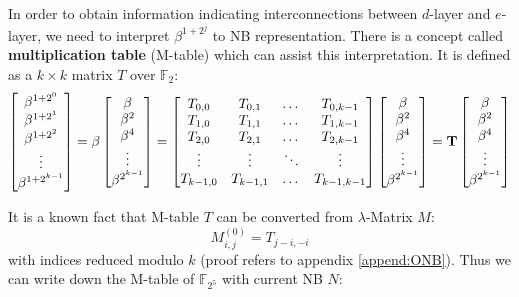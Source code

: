 \begin{Example}
In order to obtain information 
indicating interconnections between $d$-layer and $e$-layer, we need to interpret $\beta^{1+2^j}$ 
to NB representation.
There is a concept called {\bf multiplication table} (M-table) which can assist this interpretation. It is defined as 
a $k\times k$ matrix $T$ over $\mathbb F_2$:
\begin{equation}
\label{eqn:multitable}
\begin{bmatrix}
\beta^{1+2^0} \\ \beta^{1+2^1} \\ \beta^{1+2^2} \\ \vdots \\ \beta^{1+2^{k-1}}
\end{bmatrix}
= \beta
\begin{bmatrix}
\beta \\ \beta^2 \\ \beta^4 \\ \vdots \\ \beta^{2^{k-1}}
\end{bmatrix}
=
\begin{bmatrix}
T_{0,0}      &   T_{0,1}        & \dots & T_{0,k-1}\\
T_{1,0}    &   T_{1,1}           & \dots & T_{1,k-1}\\
T_{2,0}    &   T_{2,1}           & \dots & T_{2,k-1}\\
\vdots & \vdots              & \ddots     & \vdots \\
T_{k-1,0}    &   T_{k-1,1}           & \dots & T_{k-1,k-1}
\end{bmatrix}
\begin{bmatrix}
\beta \\ \beta^2 \\ \beta^4 \\ \vdots \\ \beta^{2^{k-1}}
\end{bmatrix}
= {\bf T}
\begin{bmatrix}
\beta \\ \beta^2 \\ \beta^4 \\ \vdots \\ \beta^{2^{k-1}}
\end{bmatrix}
\end{equation}

It is a known fact that M-table $T$ can be converted from $\lambda$-Matrix $M$:
$$M_{i,j}^{(0)} = T_{j-i,-i}$$
with indices reduced modulo $k$ (proof refers to appendix \ref{append:ONB}). Thus we can write down the M-table of $\mathbb F_{2^5}$ with current NB $N$:


\end{Example}
